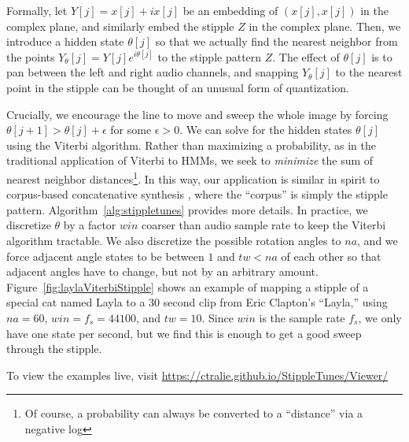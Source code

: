 \documentclass{article}
\begin{document}
Formally, let $Y[j] = x[j] + i x[j]$ be an embedding of $(x[j], x[j])$ in the complex plane, and similarly embed the stipple $Z$ in the complex plane.  Then, we introduce a hidden state $\theta[j]$ so that we actually find the nearest neighbor from the points $Y_{\theta}[j] = Y[j] e^{i \theta[j]}$ to the stipple pattern $Z$.  The effect of $\theta[j]$ is to pan between the left and right audio channels, and snapping $Y_{\theta}[j]$ to the nearest point in the stipple can be thought of an unusual form of quantization.  


Crucially, we encourage the line to move and sweep the whole image by forcing $\theta[j+1] > \theta[j] + \epsilon$ for some $\epsilon > 0$.  We can solve for the hidden states $\theta[j]$ using the Viterbi algorithm.  Rather than maximizing a probability, as in the traditional application of Viterbi to HMMs, we seek to {\em minimize} the sum of nearest neighbor distances\footnote{Of course, a probability can always be converted to a ``distance'' via a negative log}.  In this way, our application is similar in spirit to corpus-based concatenative synthesis \cite{schwarz2007corpus}, where the ``corpus'' is simply the stipple pattern.  Algorithm~\ref{alg:stippletunes} provides more details. In practice, we discretize $\theta$ by a factor $win$ coarser than audio sample rate to keep the Viterbi algorithm tractable.  We also discretize the possible rotation angles to $na$, and we force adjacent angle states to be between $1$ and $tw < na$ of each other so that adjacent angles have to change, but not by an arbitrary amount.  Figure~\ref{fig:laylaViterbiStipple} shows an example of mapping a stipple of a special cat named Layla to a 30 second clip from Eric Clapton's ``Layla,'' using $na=60$, $win=f_s=44100$, and $tw=10$.  Since $win$ is the sample rate $f_s$, we only have one state per second, but we find this is enough to get a good sweep through the stipple.

To view the examples live, visit \url{https://ctralie.github.io/StippleTunes/Viewer/}






\end{document}
